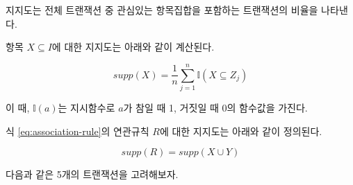 \documentclass[]{book}
\begin{document}
지지도는 전체 트랜잭션 중 관심있는 항목집합을 포함하는 트랜잭션의 비율을 나타낸다.

항목 \(X \subseteq I\)에 대한 지지도는 아래와 같이 계산된다.

\begin{equation*}
supp(X) = \frac{1}{n} \sum_{j = 1}^{n} \mathbb{I}(X \subseteq Z_j)
\end{equation*}

이 때, \(\mathbb{I}(a)\)는 지시함수로 \(a\)가 참일 때 1, 거짓일 때 0의 함수값을 가진다.

식 \eqref{eq:association-rule}의 연관규칙 \(R\)에 대한 지지도는 아래와 같이 정의된다.

\begin{equation*}
supp(R) = supp(X \cup Y)
\end{equation*}

다음과 같은 5개의 트랜잭션을 고려해보자.
\end{document}
